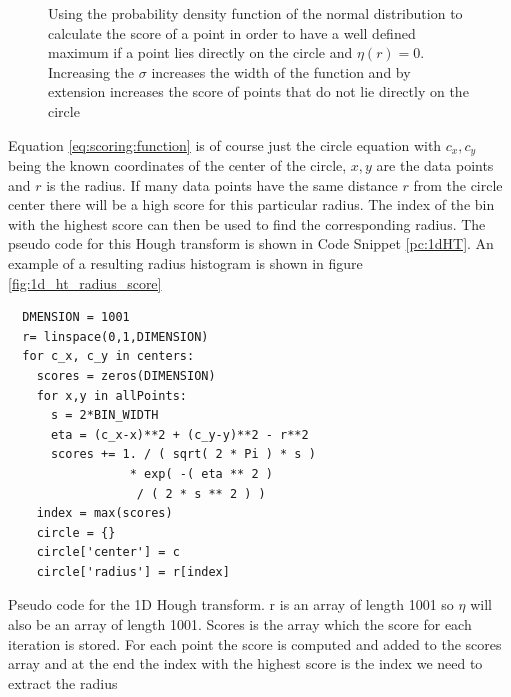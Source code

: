 \documentclass[11pt]{scrreprt}
\begin{document}
\begin{figure}[ht]
\centering
    \caption[Normal Distribution: Used as a weight function]{Using the probability density function of the normal distribution to 
    calculate the score of a point in order to have a well defined maximum if a point lies directly on the circle and $\eta(r) = 0$. 
    Increasing the $\sigma$ increases the width of the function and by extension increases the score of points that do not lie directly on the circle}
  \label{fig:gauss}
\end{figure}
Equation \ref{eq:scoring:function} is of course just the circle equation with $c_x, c_y$ being the known coordinates of the center of 
the circle, $x, y$ are the data points and $r$ is the radius. If many data points have the same distance $r$ from the circle 
center there will be a high score for this particular radius. The index of the bin with the highest score can then be used to find the 
corresponding radius. The pseudo code for this Hough transform is shown in Code Snippet \ref{pc:1dHT}. An example of a resulting radius
histogram is shown in figure \ref{fig:1d_ht_radius_score}

\begin{codesnippet}[htb]
  \begin{lstlisting}
  DMENSION = 1001
  r= linspace(0,1,DIMENSION)
  for c_x, c_y in centers:
    scores = zeros(DIMENSION)
    for x,y in allPoints:
      s = 2*BIN_WIDTH
      eta = (c_x-x)**2 + (c_y-y)**2 - r**2
      scores += 1. / ( sqrt( 2 * Pi ) * s ) 
                 * exp( -( eta ** 2 ) 
                  / ( 2 * s ** 2 ) )
    index = max(scores)
    circle = {}
    circle['center'] = c
    circle['radius'] = r[index]
\end{lstlisting}
\caption[Pseudo Code 1D HT]{Pseudo code for the 1D Hough transform. r is an array of length 1001 so $\eta$ will also be an 
array of length 1001. Scores is the array which the score for each iteration is stored. For each point the score is computed and added 
to the scores array and at the end the index with the highest score is the index we need to extract the radius}\label{pc:1dHT}
\end{codesnippet}
\end{document}
